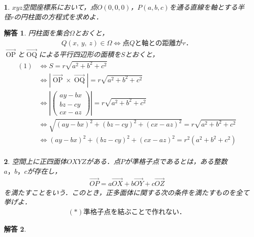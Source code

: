 \documentclass[dvipdfmx]{jsarticle}
\newtheorem*{answer*}{解答}
\newtheorem{prob}{}[]
\begin{document}
\begin{screen}
  \begin{prob}
    $xyz$空間座標系において，点$O(0,0,0)$，$P(a,b,c)$を通る直線を軸とする半径$r$の円柱面の方程式を求めよ．
  \end{prob}
\end{screen}
\begin{answer*}
  円柱面を集合$\Omega $とおくと，
  \begin{align}
    Q(x,\ y,\ z)\in \Omega \Longleftrightarrow  点Qと軸との距離がr．
  \end{align}
  $\overrightarrow{\operatorname{OP}} $と$\overrightarrow{\operatorname{OQ}}$による平行四辺形の面積を$S$とおくと，
  \begin{align*}
    (1)
    &\Longleftrightarrow S=r\sqrt{a^2+b^2+c^2}\\
    &\Longleftrightarrow \left\lvert \overrightarrow{\operatorname{OP}}\times \overrightarrow{\operatorname{OQ}}\right\rvert =r\sqrt{a^2+b^2+c^2}\\
    &\Longleftrightarrow\left\lvert 
    \begin{pmatrix}
      ay-bx\\
      bz-cy\\
      cx-az
    \end{pmatrix}
    \right\rvert =r\sqrt{a^2+b^2+c^2}\\
    &\Longleftrightarrow \sqrt{(ay-bx)^2+(bz-cy)^2+(cx-az)^2}=r\sqrt{a^2+b^2+c^2}\\
    &\Longleftrightarrow (ay-bx)^2+(bz-cy)^2+(cx-az)^2=r^2(a^2+b^2+c^2)\\
  \end{align*}
  \rightline{$\Box $}
\end{answer*}
\newpage
\begin{screen}
  \begin{prob}
    空間上に正四面体$OXYZ$がある．点$P$が準格子点であるとは，ある整数$a，b，c$が存在し，
  \begin{align*}
    \overrightarrow{OP}=a\overrightarrow{OX}+b\overrightarrow{OY}+c\overrightarrow{OZ}  
  \end{align*}
  を満たすことをいう．このとき，正多面体に関する次の条件を満たすものを全て挙げよ．
  \begin{align*}
    (*)準格子点を結ぶことで作れない．
  \end{align*}  
  \end{prob} 
\end{screen}
\begin{answer*}
\end{answer*}
\end{document}
